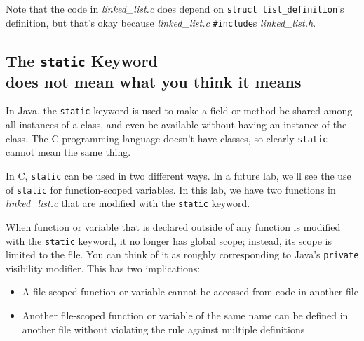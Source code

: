 Note that the code in \textit{linked\_list.c} does depend on \lstinline{struct list_definition}'s definition, but that's okay because \textit{linked\_list.c} \lstinline{#include}s \textit{linked\_list.h}.


\subsection{The \lstinline{static} Keyword \\ \footnotesize{does not mean what you think it means}}

In Java, the \lstinline{static} keyword is used to make a field or method be shared among all instances of a class, and even be available without having an instance of the class.
The C programming language doesn't have classes, so clearly \lstinline{static} cannot mean the same thing.

In C, \lstinline{static} can be used in two different ways.
In a future lab, we'll see the use of \lstinline{static} for function-scoped variables.
In this lab, we have two functions in \textit{linked\_list.c} that are modified with the \lstinline{static} keyword.

When function or variable that is declared outside of any function is modified with the \lstinline{static} keyword, it no longer has global scope;
instead, its scope is limited to the file.
You can think of it as roughly corresponding to Java's \lstinline{private} visibility modifier.
This has two implications:
\begin{itemize}
    \item A file-scoped function or variable cannot be accessed from code in another file
    \item Another file-scoped function or variable of the same name can be defined in another file without violating the rule against multiple definitions
\end{itemize}
